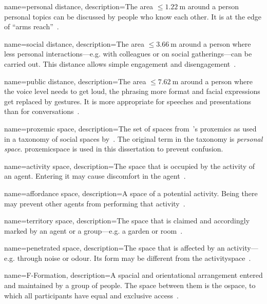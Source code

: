 {
	name={personal distance},
	description={The area \(\leq\SI{1.22}{\meter}\) around a person personal topics can be discussed by people who know each other. It is at the edge of \enquote{arms reach}~\cite[]{Hall1969}.}
}

{
	name={social distance},
	description={The area \(\leq\SI{3.66}{\meter}\) around a person where less personal interactions---e.g. with colleagues or on social gatherings---can be carried out. This distance allows simple engagement and disengagement~\cite[]{Hall1969}.}
}

{
	name={public distance},
	description={The area \(\leq\SI{7.62}{\meter}\) around a person where the voice level needs to get loud, the phrasing more format and facial expressions get replaced by gestures. It is more appropriate for speeches and presentations than for \glspl{conversation}~\cite[]{Hall1969}.}
}

{
	name={proxemic space},
	description={The set of spaces from~\citeauthor{Hall1969}'s \gls{proxemics} as used in a taxonomy of social spaces by~\cite{Lindner2011}. The original term in the taxonomy is \emph{personal space}. \Gls{proxemicspace} is used in this dissertation to prevent confusion.}
}

{
	name={activity space},
	description={The space that is occupied by the activity of an agent. Entering it may cause discomfort in the agent~\cite[]{Lindner2011}.}
}

{
	name={affordance space},
	description={A space of a potential activity. Being there may prevent other agents from performing that activity~\cite[]{Lindner2011}.}
}

{
	name={territory space},
	description={The space that is claimed and accordingly marked by an agent or a group---e.g. a garden or room~\cite[]{Lindner2011}.}
}

{
	name={penetrated space},
	description={The space that is affected by an activity---e.g. through noise or odour. Its form may be different from the \gls{activityspace}~\cite[]{Lindner2011}.}
}

{
	name={F-Formation},
	description={A spacial and orientational arrangement entered and maintained by a group of people. The space between them is the \gls{ospace}, to which all participants have equal and exclusive access~\cite[p. 209]{kendon1990}.}
}

